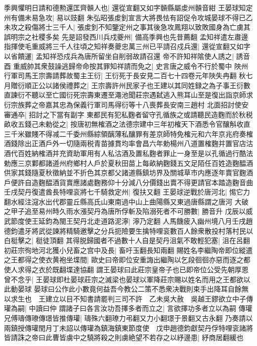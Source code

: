 季興懼明日請和德勲還匡齊贑人也|{
	還從宣翻又如字贑縣屬䖍州贑音紺}
王晏球知定州有備未易急攻|{
	易以豉翻}
朱弘昭張䖍釗宣言大將畏怯有詔促令攻城晏球不得已乙未攻之殺傷將士三千人|{
	張䖍釗不知鑒定州之事其後急攻鳳翔以致敗國身為亡虜其誤明宗之社稷多矣}
先是詔發西川兵戍夔州|{
	備高季興也先昔薦翻}
孟知祥遣左肅邊指揮使毛重威將三千人往頃之知祥奏夔忠萬三州已平請召戍兵還|{
	還從宣翻又如字}
以省饋運|{
	孟知祥恐戍兵為唐所留坐自削弱故請召還}
帝不許知祥隂使人誘之|{
	誘音酉}
重威帥其衆鼓譟逃歸帝命按其罪知祥請而免之|{
	史言唐之威令不行於蜀中}
陜州行軍司馬王宗壽請葬故蜀主王衍|{
	王衍死于長安見二百七十四卷元年陜失冉翻}
秋七月贈衍順正公以諸侯禮葬之|{
	王宗壽許州民家子也王建以其同姓録之為子事王衍數直諫衍不聽以至亡國衍死宗壽東遷至澠池聞莊宗遇弑逃入熊耳山至是復出詣京師求衍宗族葬之帝嘉其忠為保義行軍司馬得衍等十八喪葬長安南三趙村}
北面招討使安審通卒|{
	招討之下當有副字}
東都民有犯私麴者留守孔循族之或請聽民造麴而於秋税畝收五錢己未勅從之|{
	按唐初無榷酒之法德宗建中三年初榷天下酒悉令官釀斛收直三千米雖賤不得减二千委州縣綜領醨薄私釀罪有差京師特免榷元和六年京兆府奏榷酒錢除出正酒戶外一切隨兩税青苗據貫均率會昌六年勅楊州八道置榷麴并置官店沽酒代百姓納榷酒并充資助軍用有人私沽酒及置私麴者罪止一身至是以孔循過行酷法勅應三京鄴都諸道州府鄉村人戶於夏秋田苗上每畝納麴錢五文足陌任百姓造麴醖酒供家其錢隨夏秋徵納並不折色其京都父諸道縣鎮坊界及關城草市内應逐年賣官麴酒戶便許自造麴醖酒貨賣應諸處麴務仰十分減八分價錢出賣不得更請官本踏造麴音曲}
壬戌契丹復遣酋長特哩衮將七千騎救定州|{
	復扶又翻}
王晏球逆戰於唐河北|{
	惕它力翻水經注滱水出代郡靈丘縣高氏山東南過中山上曲陽縣又東過唐縣謂之唐河}
大破之甲子追至易州時久雨水漲契丹為唐所俘斬及陷溺死者不可勝數|{
	勝音升}
戊辰以威武節度使王延鈞為閩王契丹北走道路泥濘|{
	濘乃定翻}
人馬饑疲入幽州境八月壬戌趙德鈞遣牙將武從諫將精騎邀擊之分兵扼險要生擒特哩衮數百人餘衆散投村落村民以白梃擊之|{
	梃徒頂翻}
其得脱歸國者不過數十人自是契丹沮氣不敢輕犯塞|{
	沮在呂翻}
初莊宗徇地河北獲小兒畜之宫中及長|{
	畜吁玉翻長知兩翻}
賜姓名李繼陶帝即位縱遣之王都得之使衣黄袍坐堞間|{
	歐史曰帝即位安重誨出繼陶以乞段徊徊亦惡而逐之都使人求得之衣於既翻堞達協翻}
謂王晏球曰此莊宗皇帝子也已即帝位公受先朝厚恩曾不念乎|{
	王晏球即杜晏球莊宗之滅梁也晏球以軍降莊宗賜以姓名而用之王都欲以此動晏球}
晏球曰公作此小數竟何益吾今教公二策不悉衆决戰則束手出降耳自餘無以求生也　王建立以目不知書請罷判三司不許　乙未吳大赦　吳越王鏐欲立中子傳瓘為嗣|{
	中讀曰仲}
謂諸子曰各言汝功吾擇多者而立之|{
	言欲擇功多者立以為嗣}
傳瓘兄傅璹傳璙傳璟皆推傳瓘|{
	璹殊六翻璙力弔翻又力小翻璟于景翻又古永翻}
乃奏請以兩鎮授傳瓘閏月丁未詔以傳瓘為鎮海鎮東節度使　戊申趙德鈞獻契丹俘特哩衮諸將皆請誅之帝曰此曹皆虜中之驍將殺之則虜絶望不若存之以紓邊患|{
	紓商居翻緩也}
